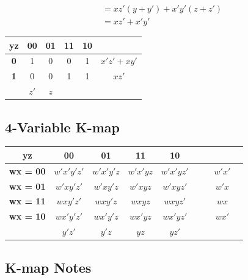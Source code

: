 \begin{align*}
    &= xz'(y + y') + x'y'(z + z') \\
    &= xz' + x'y'
\end{align*}

\begin{center}
\begin{tabular}{c|cccc|c}
    \textbf{yz} & \textbf{00} & \textbf{01} & \textbf{11} & \textbf{10} & \\
    \hline
    \textbf{0} & 1          & 0          & 0          & 1          & $x'z' + xy'$ \\
    \textbf{1} & 0          & 0          & 1          & 1          & $xz'$ \\
    \hline
               & $z'$       & $z$        &            &            & 
\end{tabular}
\end{center}

\subsection{4-Variable K-map}

\bigskip
\begin{center}
\begin{tabular}{c|ccccccc|c}
    \textbf{yz} & \textbf{00} & \textbf{01} & \textbf{11} & \textbf{10} & & & \\
    \hline
    \textbf{wx = 00}    & $w'x'y'z'$ & $w'x'y'z$ & $w'x'yz$ & $w'x'yz'$ & & & $w'x'$ \\
    \textbf{wx = 01}    & $w'xy'z'$ & $w'xy'z$ & $w'xyz$ & $w'xyz'$ & & & $w'x$ \\
    \textbf{wx = 11}    & $wxy'z'$ & $wxy'z$ & $wxyz$ & $wxyz'$ & & & $wx$ \\
    \textbf{wx = 10}    & $wx'y'z'$ & $wx'y'z$ & $wx'yz$ & $wx'yz'$ & & & $wx'$ \\
    \hline
                       & $y'z'$    & $y'z$     & $yz$     & $yz'$     & & &
\end{tabular}
\end{center}

\subsection{K-map Notes}

